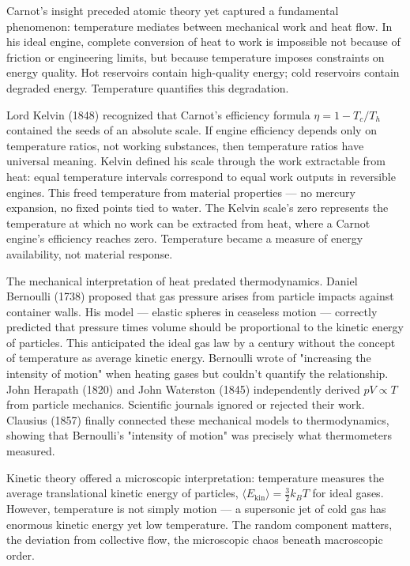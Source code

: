 Carnot's insight preceded atomic theory yet captured a fundamental phenomenon: temperature mediates between mechanical work and heat flow. In his ideal engine, complete conversion of heat to work is impossible not because of friction or engineering limits, but because temperature imposes constraints on energy quality. Hot reservoirs contain high-quality energy; cold reservoirs contain degraded energy. Temperature quantifies this degradation.

Lord Kelvin (1848) recognized that Carnot's efficiency formula $\eta = 1 - T_c/T_h$ contained the seeds of an absolute scale. If engine efficiency depends only on temperature ratios, not working substances, then temperature ratios have universal meaning. Kelvin defined his scale through the work extractable from heat: equal temperature intervals correspond to equal work outputs in reversible engines. This freed temperature from material properties — no mercury expansion, no fixed points tied to water. The Kelvin scale's zero represents the temperature at which no work can be extracted from heat, where a Carnot engine's efficiency reaches zero. Temperature became a measure of energy availability, not material response.

The mechanical interpretation of heat predated thermodynamics. Daniel Bernoulli (1738) proposed that gas pressure arises from particle impacts against container walls. His model — elastic spheres in ceaseless motion — correctly predicted that pressure times volume should be proportional to the kinetic energy of particles. This anticipated the ideal gas law by a century without the concept of temperature as average kinetic energy. Bernoulli wrote of "increasing the intensity of motion" when heating gases but couldn't quantify the relationship. John Herapath (1820) and John Waterston (1845) independently derived $pV \propto T$ from particle mechanics. Scientific journals ignored or rejected their work. Clausius (1857) finally connected these mechanical models to thermodynamics, showing that Bernoulli's "intensity of motion" was precisely what thermometers measured.

Kinetic theory offered a microscopic interpretation: temperature measures the average translational kinetic energy of particles, $ \langle E_{\text{kin}} \rangle = \frac{3}{2}k_B T $ for ideal gases. However, temperature is not simply motion — a supersonic jet of cold gas has enormous kinetic energy yet low temperature. The random component matters, the deviation from collective flow, the microscopic chaos beneath macroscopic order.

